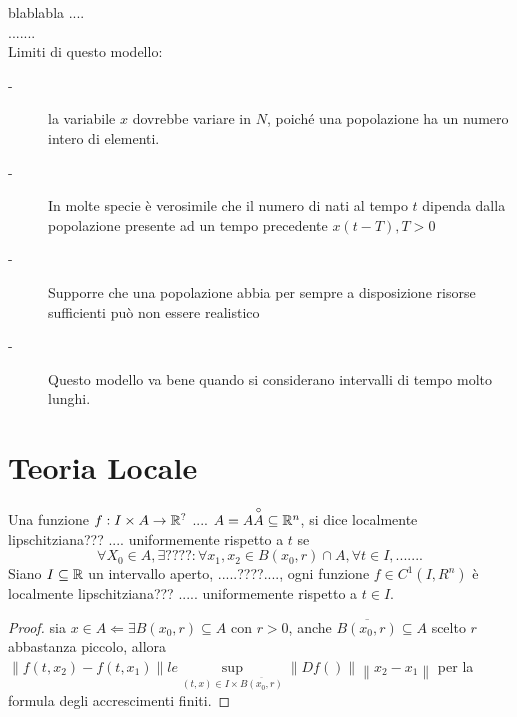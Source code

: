 blablabla ....\\
.......\\
Limiti di questo modello:
\begin{description}
	\item[-] la variabile $x$ dovrebbe variare in $N$, poiché una popolazione ha un numero intero di elementi.
	\item[-] In molte specie è verosimile che il numero di nati al tempo $t$ dipenda dalla popolazione presente ad un tempo precedente $x(t-T), T>0$
	\item[-] Supporre che una popolazione abbia per sempre a disposizione risorse sufficienti può non essere realistico
	\item[-] Questo modello va bene quando si considerano intervalli di tempo molto lunghi.
\end{description}

\section{Teoria Locale}
 Una funzione $f:I\times A\to \mathbb{R}^{?}$ .... $A=A\overset{\circ}{A}\subseteq \mathbb{R}^n$, si dice localmente lipschitziana??? .... uniformemente rispetto a $t$ se $$\forall X_0 \in A, \exists ???? : \forall x_1,x_2 \in B(x_0,r)\cap A, \forall t\in I, .......$$
\proposition
Siano $I\subseteq \mathbb{R}$ un intervallo aperto, .....????...., ogni funzione $f\in C^1(I,R^n)$ è localmente lipschitziana??? ..... uniformemente rispetto a $t\in I$.
\begin{proof}
	sia $x\in A \Leftarrow \exists B(x_0,r)\subseteq A$ con $r>0$, anche $\overline{B(x_0,r)}\subseteq A$ scelto $r$ abbastanza piccolo, allora $\left\| f(t,x_2)-f(t,x_1)\right\|le\sup\limits_{(t,x)\in I\times \overline{B(x_0,r)}}\left\| Df() \right\|\left\| x_2-x_1 \right\|  $ per la formula degli accrescimenti finiti.  
\end{proof}
